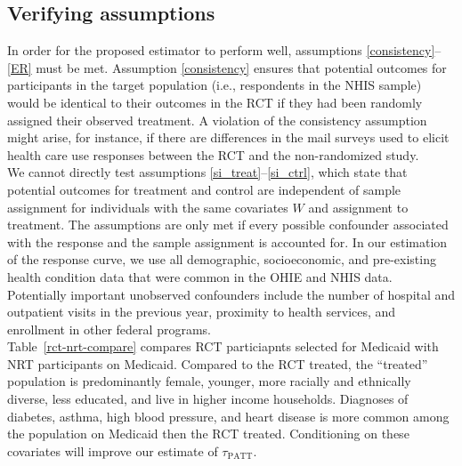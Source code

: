 \documentclass[12pt]{article}
\begin{document}
\subsection{Verifying assumptions}

In order for the proposed estimator to perform well, assumptions \eqref{consistency}--\eqref{ER} must be met.  Assumption \eqref{consistency} ensures that potential outcomes for participants in the target population (i.e., respondents in the NHIS sample) would be identical to their outcomes in the RCT if they had been randomly assigned their observed treatment. A violation of the consistency assumption might arise, for instance, if there are differences in the mail surveys used to elicit health care use responses between the RCT and the non-randomized study. \\
 
We cannot directly test assumptions \eqref{si_treat}--\eqref{si_ctrl}, which state that potential outcomes for treatment and control are independent of sample assignment for individuals with the same covariates $W$ and assignment to treatment.  The assumptions are only met if every possible confounder associated with the response and the sample assignment is accounted for.  In our estimation of the response curve, we use all demographic, socioeconomic, and pre-existing health condition data that were common in the OHIE and NHIS data.  Potentially important unobserved confounders include the number of hospital and outpatient visits in the previous year, proximity to health services, and enrollment in other federal programs. \\

Table~\ref{rct-nrt-compare} compares RCT particiapnts selected for Medicaid with NRT participants on Medicaid. Compared to the RCT treated, the ``treated'' population is predominantly female, younger, more racially and ethnically diverse, less educated, and live in higher income households. Diagnoses of diabetes, asthma, high blood pressure, and heart disease is more common among the population on Medicaid then the RCT treated. Conditioning on these covariates will improve our estimate of $\tau_{\text{PATT}}$. \\
\end{document}
